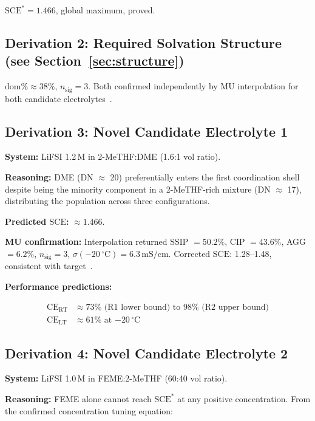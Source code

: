 \documentclass[12pt,letterpaper]{article}
\newcommand{\mSCE}{\mathrm{SCE}}
\newcommand{\mSCEstar}{\mathrm{SCE}^{*}}
\newcommand{\mCERT}{\mathrm{CE}_{\mathrm{RT}}}
\newcommand{\mCELT}{\mathrm{CE}_{\mathrm{LT}}}
\begin{document}
$\mSCEstar = 1.466$, global maximum, proved.

\subsection{Derivation 2: Required Solvation Structure
(see Section~\ref{sec:structure})}

$\mathrm{dom\%} \approx 38\%$, $n_{\mathrm{sig}} = 3$.
Both confirmed independently by MU interpolation for
both candidate electrolytes~\cite{mu2026query1,
mu2026query3}.

\subsection{Derivation 3: Novel Candidate Electrolyte 1}
\label{sec:cand1}

\textbf{System:} LiFSI 1.2\,M in 2-MeTHF:DME
(1.6:1 vol ratio).

\textbf{Reasoning:}
DME (DN $\approx$ 20) preferentially enters the first
coordination shell despite being the minority component
in a 2-MeTHF-rich mixture (DN $\approx$ 17),
distributing the population across three configurations.

\textbf{Predicted $\mSCE$:} $\approx 1.466$.

\textbf{MU confirmation:} Interpolation returned
SSIP $= 50.2\%$, CIP $= 43.6\%$,
AGG $= 6.2\%$, $n_{\mathrm{sig}} = 3$,
$\sigma(-20\,^{\circ}\mathrm{C}) = 6.3\,\mathrm{mS/cm}$.
Corrected $\mSCE$: 1.28--1.48, consistent with
target~\cite{mu2026query2}.

\textbf{Performance predictions:}

\begin{align}
  \mCERT &\approx 73\%
  \text{ (R1 lower bound) to }
  98\%
  \text{ (R2 upper bound)}
  \label{eq:cand1rt}\\
  \mCELT &\approx 61\%
  \text{ at } {-20\,^{\circ}\mathrm{C}}
  \label{eq:cand1lt}
\end{align}

\subsection{Derivation 4: Novel Candidate Electrolyte 2}
\label{sec:cand2}

\textbf{System:} LiFSI 1.0\,M in FEME:2-MeTHF
(60:40 vol ratio).

\textbf{Reasoning:}
FEME alone cannot reach $\mSCEstar$ at any positive
concentration.
From the confirmed concentration tuning equation:
\end{document}
